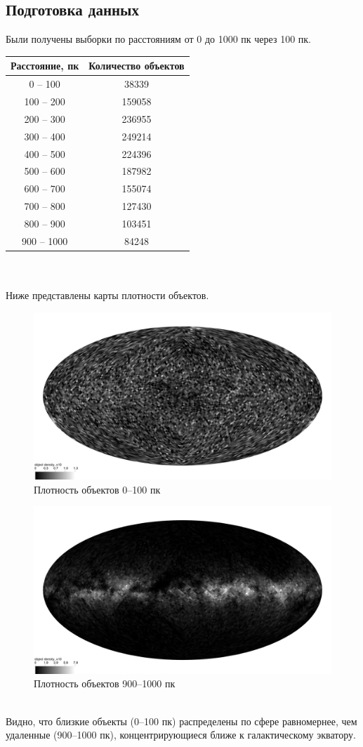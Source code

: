 \documentclass[14pt]{article} %
\begin{document}
\subsection{Подготовка данных}
Были получены выборки по расстояниям от 0 до 1000 пк через 100 пк.
\begin{tabular}{|c|c|}
\hline
Расстояние, пк&Количество объектов\\
\hline
0 -- 100&38339\\
100 -- 200&159058\\
200 -- 300&236955\\
300 -- 400&249214\\
400 -- 500&224396\\
500 -- 600&187982\\
600 -- 700&155074\\
700 -- 800&127430\\
800 -- 900&103451\\
900 -- 1000&84248\\
\hline
\end{tabular}\\\\
Ниже представлены карты плотности объектов.\\
\begin{figure}[h!]
\includegraphics[width=1\linewidth]{healpdens100.jpg}
\caption*{Плотность объектов 0--100 пк}
\end{figure}
\begin{figure}[h!]
\includegraphics[width=1\linewidth]{healpdens900.jpg}
\caption*{Плотность объектов 900--1000 пк}
\end{figure}
\\Видно, что близкие объекты (0--100 пк) распределены по сфере равномернее, чем удаленные (900--1000 пк), концентрирующиеся ближе к галактическому экватору.
\end{document}
